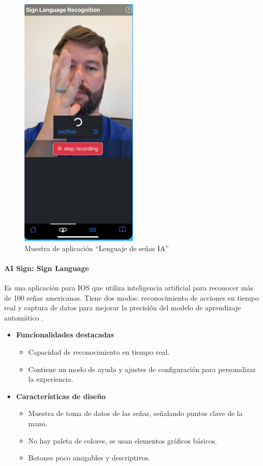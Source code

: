 \begin{figure}[H]
    \centering
    \includegraphics[width=0.2\linewidth]{figuras/applenguasenasia.png}
    \caption{Muestra de aplicación “Lenguaje de señas IA”}
    \label{fig:enter-label}
\end{figure}

\paragraph{AI Sign: Sign Language}

Es una aplicación para IOS que utiliza inteligencia artificial para reconocer más de 100 señas americanas. Tiene dos modos: reconocimiento de acciones en tiempo real y captura de datos para mejorar la precisión del modelo de aprendizaje automático \cite{AISign2023}.

\begin{itemize}
    \item \textbf{Funcionalidades destacadas}
    \begin{itemize}
        \item Capacidad de reconocimiento en tiempo real.
        \item Contiene un modo de ayuda y ajustes de configuración para personalizar la experiencia.
    \end{itemize}

    \item \textbf{Características de diseño}
    \begin{itemize}
        \item Muestra de toma de datos de las señas, señalando puntos clave de la mano.
        \item No hay paleta de colores, se usan elementos gráficos básicos.
        \item Botones poco amigables y descriptivos.
    \end{itemize}
\end{itemize}


